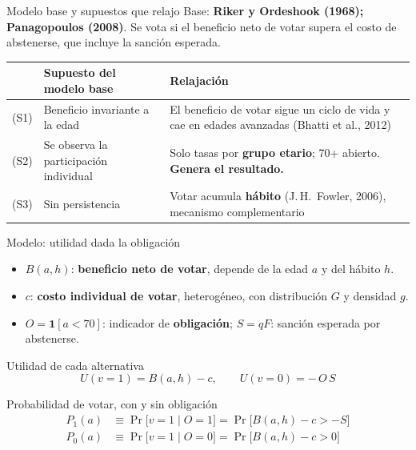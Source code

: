 \documentclass[aspectratio=169,11pt,xcolor=table]{beamer}
\newcommand{\itemgap}{1.3em}
\newcommand{\hl}[1]{\textcolor{upaccent}{\textbf{#1}}}
\begin{document}
\begin{frame}{Modelo base y supuestos que relajo}
  \small Base: \textbf{Riker y Ordeshook (1968); Panagopoulos (2008)}. Se vota si el beneficio neto de votar supera el costo de abstenerse, que incluye la sanción esperada.
  \vspace{0.25cm}

  \renewcommand{\arraystretch}{1.45}
  \begin{tabularx}{\textwidth}{@{}L{1.0cm}L{4.3cm}Y@{}}
    \toprule
    & \textbf{Supuesto del modelo base} & \textbf{Relajación} \\
    \midrule
    (S1) & Beneficio invariante a la edad & El beneficio de votar sigue un ciclo de vida y cae en edades avanzadas (Bhatti et al., 2012) \\
    (S2) & Se observa la participación individual & Solo tasas por \textbf{grupo etario}; 70+ abierto. \hl{Genera el resultado.} \\
    (S3) & Sin persistencia & Votar acumula \textbf{hábito} (J.\,H.\ Fowler, 2006), mecanismo complementario \\
    \bottomrule
  \end{tabularx}
\end{frame}

\begin{frame}{Modelo: utilidad dada la obligación}
  \small
  \renewcommand{\itemgap}{0.45em}
  \begin{itemize}
    \item $B(a,h)$: \hl{beneficio neto de votar}, depende de la edad $a$ y del hábito $h$.
    \item $c$: \hl{costo individual de votar}, heterogéneo, con distribución $G$ y densidad $g$.
    \item $O=\mathbf{1}[a<70]$: indicador de \hl{obligación}; $S=qF$: sanción esperada por abstenerse.
  \end{itemize}
  \vspace{0.1cm}
  \begin{block}{Utilidad de cada alternativa}
    \[ U(v=1)=B(a,h)-c, \qquad U(v=0)=-\,O\,S \]
  \end{block}
  \vspace{0.05cm}
  \begin{block}{Probabilidad de votar, con y sin obligación}
    \vspace{-0.15cm}
    \begin{align*}
      P_1(a) &\equiv \Pr\big[v=1 \mid O=1\big]=\Pr\big[B(a,h)-c>-S\big] \\
      P_0(a) &\equiv \Pr\big[v=1 \mid O=0\big]=\Pr\big[B(a,h)-c>0\big]
    \end{align*}
  \end{block}
\end{frame}
\end{document}
